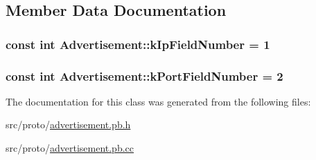 \subsection{Member Data Documentation}
\subsubsection[{\texorpdfstring{k\+Ip\+Field\+Number}{kIpFieldNumber}}]{\setlength{\rightskip}{0pt plus 5cm}const int Advertisement\+::k\+Ip\+Field\+Number = 1\hspace{0.3cm}{\ttfamily [static]}}\hypertarget{class_advertisement_af81bcf66962615be07bc839412551a28}{}\label{class_advertisement_af81bcf66962615be07bc839412551a28}
\subsubsection[{\texorpdfstring{k\+Port\+Field\+Number}{kPortFieldNumber}}]{\setlength{\rightskip}{0pt plus 5cm}const int Advertisement\+::k\+Port\+Field\+Number = 2\hspace{0.3cm}{\ttfamily [static]}}\hypertarget{class_advertisement_abf0fccf8702c996ca959a0d6ddb6a009}{}\label{class_advertisement_abf0fccf8702c996ca959a0d6ddb6a009}


The documentation for this class was generated from the following files\+:\begin{DoxyCompactItemize}
\item 
src/proto/\hyperlink{advertisement_8pb_8h}{advertisement.\+pb.\+h}\item 
src/proto/\hyperlink{advertisement_8pb_8cc}{advertisement.\+pb.\+cc}\end{DoxyCompactItemize}
